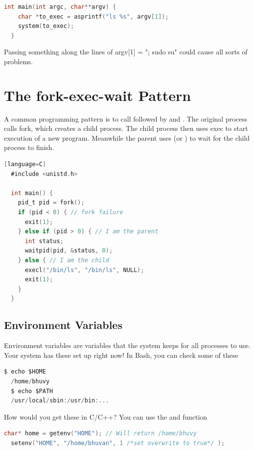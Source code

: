 \begin{lstlisting}[language=C]
  int main(int argc, char**argv) {
    char *to_exec = asprintf("ls %s", argv[1]); 
    system(to_exec);
  }
\end{lstlisting}

Passing something along the lines of argv[1] = "; sudo su" could cause all sorts of problems.

\section{The fork-exec-wait Pattern}

A common programming pattern is to call  followed by  and .
The original process calls fork, which creates a child process.
The child process then uses exec to start execution of a new program.
Meanwhile the parent uses  (or ) to wait for the child process to finish. 

\begin{lstlisting}[language=C][language=C]
  #include <unistd.h>

  int main() {
    pid_t pid = fork();
    if (pid < 0) { // fork failure
      exit(1);
    } else if (pid > 0) { // I am the parent
      int status;
      waitpid(pid, &status, 0);
    } else { // I am the child
      execl("/bin/ls", "/bin/ls", NULL);
      exit(1);
    }
  }
\end{lstlisting}

\subsection{Environment Variables}

Environment variables are variables that the system keeps for all processes to use.
Your system has these set up right now!
In Bash, you can check some of these

\begin{lstlisting}[language=C]
  $ echo $HOME
  /home/bhuvy
  $ echo $PATH
  /usr/local/sbin:/usr/bin:...
\end{lstlisting}

How would you get these in C/C++? You can use the  and  function

\begin{lstlisting}[language=C]
  char* home = getenv("HOME"); // Will return /home/bhuvy
  setenv("HOME", "/home/bhuvan", 1 /*set overwrite to true*/ );
\end{lstlisting}

